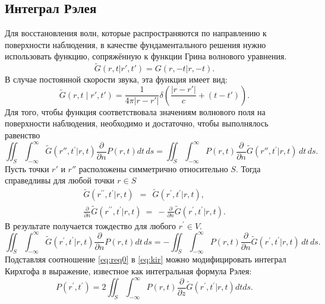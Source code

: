 \documentclass[a4paper, fontsize=14pt]{article}
\begin{document}
	\subsection{Интеграл Рэлея}
	Для восстановления волн, которые распространяются по направлению к поверхности наблюдения, в качестве фундаментального решения нужно использовать функцию, сопряжённую к функции Грина волнового уравнения.
	\begin{equation}
	\widetilde{G}( r,t|r',t')=G(r,-t|r,-t).
	\end{equation}
	В случае постоянной скорости звука, эта функция имеет вид:
	\begin{equation}
	\widetilde{G}(r,t\mid r',t')=\frac{1}{4\pi\left|r-r'\right|}\delta\left(\frac{\left|r-r'\right|}{c}+(t-t')\right).
	\end{equation}
	Для того, чтобы функция соответствовала значениям волнового поля на поверхности наблюдения, необходимо и достаточно, чтобы выполнялось равенство
	\begin{equation}
	\iint_{S}\int_{-\infty}^{\infty}{\widetilde{G}}\left(r'',t^{\prime}|r,t\right){\frac{\partial}{\partial n}}P(r,t)d t\,d s = \iint_{S}\int_{-\infty}^{\infty}P(r,t){\frac{\partial}{\partial n}}{\widetilde{G}}\left(r'',t^{\prime}|r,t\right)\,d t\,d s.
	\end{equation}
	Пусть точки $r'$ и $r''$ расположены симметрично относительно $S$. Тогда справедливы для любой точки $r\in S$
	\begin{eqnarray}
		\widetilde{{{G}}}\left({r}^{\prime\prime},t^{\prime}|{r},t\right)~~=~~\widetilde{G}\left({r}^{\prime},t^{\prime}|{r},t\right), \\
		\frac{\partial}{\partial n}\widetilde G\left({ r}^{\prime\prime},t^{\prime}|{ r},t\right)~=~-\frac{\partial}{\partial n}\widetilde G\left({ r}^{\prime},t^{\prime}|{ r},t\right).
	\end{eqnarray}
	В результате получается тождество для любого ${ r}^{\prime}\in V$.
	\begin{equation}
	\iint_{S}\int_{-\infty}^{\infty}\widetilde{G}\left({r}^{\prime},t^{\prime}|{r},t\right)\frac{\partial}{\partial n}P({r},t)d t\,d s = -\iint_{S}\int_{-\infty}^{\infty}P({ r},t){\frac{\partial}{\partial n}}\widetilde{G}\left({ r}^{\prime},t^{\prime}|{ r},t\right)\,d t\,d s.
	\label{eq:req0}
	\end{equation}
Подставляя соотношение \ref{eq:req0} в \ref{eq:kir} можно модифицировать интеграл Кирхгофа в выражение, 
известное как интегральная формула Рэлея:
\begin{equation}
P({ r}^{\prime},t^{\prime})=2\iint_{S}\int_{-\infty}^{\infty}P({ r},t)\frac{\partial}{\partial z}\widetilde{G}\left({ r}^{\prime},t^{\prime}|{ r},t\right)d t d s.
\label{eq:rayleighorig}
\end{equation}
\end{document}
